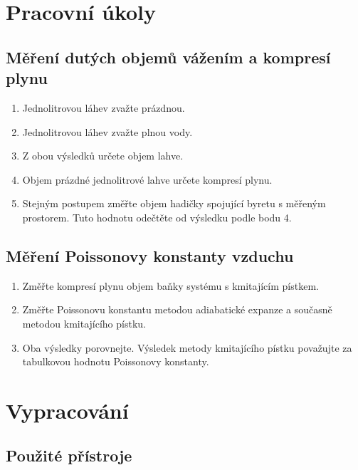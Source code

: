 \documentclass[english]{article}
\begin{document}


\setlength{\parindent}{0.5cm}
\section{Pracovní úkoly}

	\subsection{Měření dutých objemů vážením a kompresí plynu}
		\begin{enumerate}
			\item Jednolitrovou láhev zvažte prázdnou.
			\item Jednolitrovou láhev zvažte plnou vody.
			\item Z obou výsledků určete objem lahve.
			\item Objem prázdné jednolitrové lahve určete kompresí plynu.
			\item Stejným postupem změřte objem hadičky spojující byretu s měřeným prostorem. Tuto hodnotu odečtěte od výsledku podle bodu 4.
		\end{enumerate}
		
	\subsection{Měření Poissonovy konstanty vzduchu}
			\begin{enumerate}
			\item Změřte kompresí plynu objem baňky systému s kmitajícím pístkem.
			\item Změřte Poissonovu konstantu metodou adiabatické expanze a současně metodou kmitajícího pístku.
			\item Oba výsledky porovnejte. Výsledek metody kmitajícího pístku považujte za tabulkovou hodnotu Poissonovy konstanty.
		\end{enumerate}	
	
\section{Vypracování}

	\subsection{Použité přístroje}
	
\end{document}
